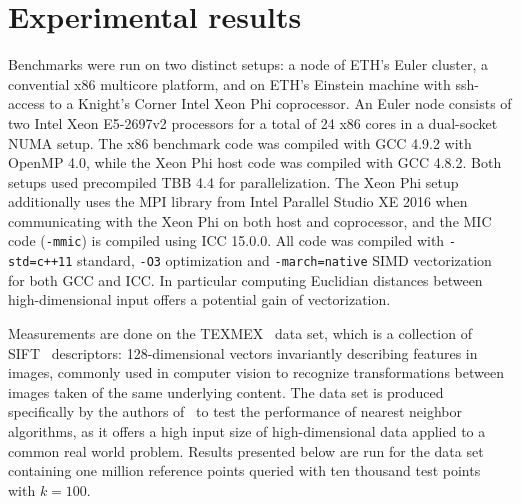 \section{Experimental results}\sloppy
  \label{sec:exp}


  Benchmarks were run on two distinct setups: a node of ETH's Euler cluster, a convential x86 multicore platform, and on ETH's Einstein machine with ssh-access to a Knight's Corner Intel Xeon Phi coprocessor. An Euler node consists of two Intel Xeon E5-2697v2 processors for a total of 24 x86 cores in a dual-socket NUMA setup. The x86 benchmark code was compiled with GCC 4.9.2 with OpenMP 4.0, while the Xeon Phi host code was compiled with GCC 4.8.2. Both setups used precompiled TBB 4.4 for
  parallelization. The Xeon
  Phi setup additionally uses the MPI library from Intel Parallel Studio XE 2016 when communicating with the Xeon Phi on both host and coprocessor, and the MIC code (\texttt{-mmic}) is compiled using ICC 15.0.0. All code was compiled with \texttt{-std=c++11} standard, \texttt{-O3} optimization and \texttt{-march=native} SIMD vectorization for both GCC and ICC. In particular computing Euclidian distances between high-dimensional input offers a potential gain of
  vectorization. 

  Measurements are done on the TEXMEX~\cite{jegou2011} data set, which is a collection of SIFT~\cite{lowe1999a,lowe2004a} descriptors: 128-dimensional vectors invariantly describing features in images, commonly used in computer vision to recognize transformations between images taken of the same underlying content. The data set is produced specifically by the authors of~\cite{jegou2011} to test the performance of nearest neighbor algorithms, as it offers a high input size of
  high-dimensional data applied to a common real world problem. Results presented below are run for the data set containing one million reference points queried with ten thousand test points with $k=100$.  

